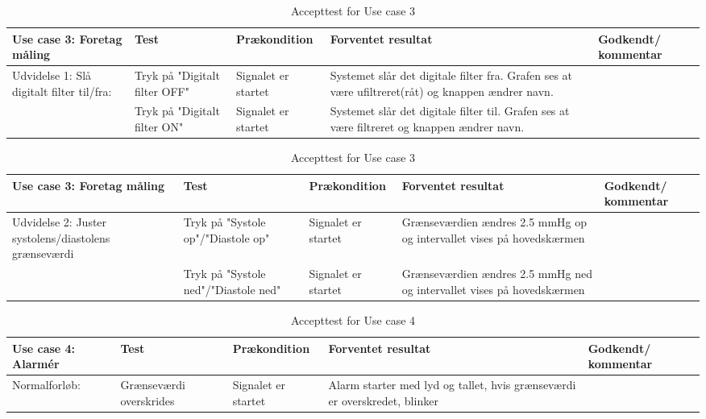 \begin{table}[H]
\caption{Accepttest for Use case 3}\label{tab:tabel8}
\begin{tabular}{|>{\raggedright\arraybackslash}p{2.5cm}| >{\raggedright\arraybackslash}p{2.9cm} | >{\raggedright\arraybackslash}p{2.9cm} | >{\raggedright\arraybackslash}p{2.9cm} | >{\raggedright\arraybackslash}p{2.8cm} |}
   \hline
   \textbf{Use case 3: Foretag måling} &\textbf{Test}& \textbf{Prækondition} & \textbf{Forventet resultat} & \textbf{Godkendt/ kommentar}\\ \hline
   Udvidelse 1: Slå digitalt filter til/fra:& Tryk på "Digitalt filter OFF" & Signalet er startet & Systemet slår det digitale filter fra. Grafen ses at være ufiltreret(råt) og knappen ændrer navn. &\\\hline
   &Tryk på "Digitalt filter ON" & Signalet er startet & Systemet slår det digitale filter til. Grafen ses at være filtreret og knappen ændrer navn. &\\\hline
\end{tabular}
\end{table}


\begin{table}[H]
\caption{Accepttest for Use case 3}\label{tab:tabel8}
\begin{tabular}{|>{\raggedright\arraybackslash}p{2.5cm}| >{\raggedright\arraybackslash}p{2.9cm} | >{\raggedright\arraybackslash}p{2.9cm} | >{\raggedright\arraybackslash}p{2.9cm} | >{\raggedright\arraybackslash}p{2.8cm} |}
   \hline
   \textbf{Use case 3: Foretag måling } &\textbf{Test}& \textbf{Prækondition} & \textbf{Forventet resultat} & \textbf{Godkendt/ kommentar}\\ \hline
   Udvidelse 2: Juster systolens/diastolens grænseværdi& Tryk på "Systole op"/"Diastole op"& Signalet er startet & Grænseværdien ændres 2.5 mmHg op og intervallet vises på hovedskærmen &\\\hline
   &Tryk på "Systole ned"/"Diastole ned" & Signalet er startet & Grænseværdien ændres 2.5 mmHg ned og intervallet vises på hovedskærmen & \\\hline
\end{tabular}
\end{table}



\begin{table}[H]
\caption{Accepttest for Use case 4}\label{tab:tabel8}
\begin{tabular}{|>{\raggedright\arraybackslash}p{2.5cm}| >{\raggedright\arraybackslash}p{2.9cm} | >{\raggedright\arraybackslash}p{2.9cm} | >{\raggedright\arraybackslash}p{2.9cm} | >{\raggedright\arraybackslash}p{2.8cm} |}
   \hline
   \textbf{Use case 4: Alarmér } &\textbf{Test}& \textbf{Prækondition} & \textbf{Forventet resultat} & \textbf{Godkendt/ kommentar}\\ \hline
   Normalforløb:& Grænseværdi overskrides& Signalet er startet & Alarm starter med lyd og tallet, hvis grænseværdi er overskredet, blinker &\\\hline
\end{tabular}
\end{table}



